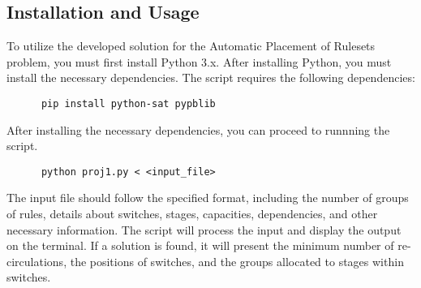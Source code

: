 \subsection{Installation and Usage}

To utilize the developed solution for the Automatic Placement of Rulesets problem, you must first install Python 3.x. After installing Python, you must install the necessary dependencies. The script requires the following dependencies:

\begin{verbatim}
      pip install python-sat pypblib
\end{verbatim}

After installing the necessary dependencies, you can proceed to runnning the script.

\begin{verbatim}
      python proj1.py < <input_file>
\end{verbatim}

The input file should follow the specified format, including the number of groups of rules, details about switches, stages, capacities, dependencies, and other necessary information. The script will process the input and display the output on the terminal. If a solution is found, it will present the minimum number of re-circulations, the positions of switches, and the groups allocated to stages within switches.